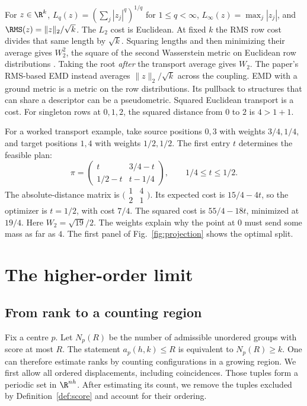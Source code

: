\documentclass[11pt,a4paper]{article}
\theoremstyle{definition}
\begin{document}
For \(z\in\R^k\), \(L_q(z)=(\sum_j |z_j|^q)^{1/q}\) for \(1\le q<\infty\), \(L_\infty(z)=\max_j|z_j|\), and \(\RMS(z)=\|z\|_2/\sqrt k\). The \(L_2\) cost is Euclidean. At fixed \(k\) the RMS row cost divides that same length by \(\sqrt k\). Squaring lengths and then minimizing their average gives \(W_2^2\), the square of the second Wasserstein metric on Euclidean row distributions \cite{transport}. Taking the root \emph{after} the transport average gives \(W_2\). The paper's RMS-based EMD instead averages \(\|z\|_2/\sqrt k\) across the coupling. EMD with a ground metric is a metric on the row distributions. Its pullback to structures that can share a descriptor can be a pseudometric. Squared Euclidean transport is a cost. For singleton rows at \(0,1,2\), the squared distance from \(0\) to \(2\) is \(4>1+1\).

For a worked transport example, take source positions \(0,3\) with weights \(3/4,1/4\), and target positions \(1,4\) with weights \(1/2,1/2\). The first entry \(t\) determines the feasible plan:
\begin{equation}\label{eq:toytransport}
\pi=
\begin{pmatrix}t&3/4-t\\1/2-t&t-1/4\end{pmatrix},
\qquad 1/4\le t\le1/2 .
\end{equation}
The absolute-distance matrix is \(\bigl(\begin{smallmatrix}1&4\\2&1\end{smallmatrix}\bigr)\). Its expected cost is \(15/4-4t\), so the optimizer is \(t=1/2\), with cost \(7/4\). The squared cost is \(55/4-18t\), minimized at \(19/4\). Here \(W_2=\sqrt{19}/2\). The weights explain why the point at \(0\) must send some mass as far as \(4\). The first panel of Fig.~\ref{fig:projection} shows the optimal split.

\section{The higher-order limit}\label{sec:limit}

\subsection{From rank to a counting region}

Fix a centre \(p\). Let \(N_p(R)\) be the number of admissible unordered groups with score at most \(R\). The statement \(a_p(h,k)\le R\) is equivalent to \(N_p(R)\ge k\). One can therefore estimate ranks by counting configurations in a growing region. We first allow all ordered displacements, including coincidences. Those tuples form a periodic set in \(\R^{nh}\). After estimating its count, we remove the tuples excluded by Definition~\ref{def:score} and account for their ordering.
\end{document}

